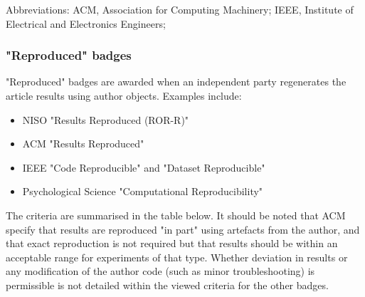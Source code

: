 \vspace*{-1.5\baselineskip}
\footnotesize
Abbreviations: ACM, Association for Computing Machinery; IEEE, Institute of Electrical and Electronics Engineers;
\normalsize 
\\

\subsubsection{"Reproduced" badges}

"Reproduced" badges are awarded when an independent party regenerates the article results using author objects.\autocite{niso_reproducibility_badging_and_definitions_working_group_reproducibility_2021} Examples include:
\begin{itemize}
    \item NISO "Results Reproduced (ROR-R)"\autocite{niso_reproducibility_badging_and_definitions_working_group_reproducibility_2021}
    \item ACM "Results Reproduced"\autocite{association_for_computing_machinery_acm_artifact_2020}
    \item IEEE "Code Reproducible" and "Dataset Reproducible"\autocite{institute_of_electrical_and_electronics_engineers_ieee_about_nodate}
    \item Psychological Science "Computational Reproducibility"\autocite{hardwicke_transparency_2023,association_for_psychological_science_aps_psychological_2023}
\end{itemize}

The criteria are summarised in the table below. It should be noted that ACM specify that results are reproduced "in part" using artefacts from the author, and that exact reproduction is not required but that results should be within an acceptable range for experiments of that type.\autocite{association_for_computing_machinery_acm_artifact_2020} Whether deviation in results or any modification of the author code (such as minor troubleshooting) is permissible is not detailed within the viewed criteria for the other badges.

